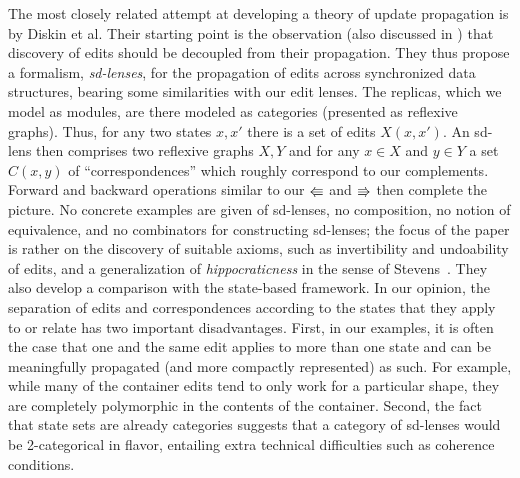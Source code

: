 
\iffull\spaceisnoissuetrue\fi  %

\newif \iftikz  \tikztrue
The most closely related attempt at developing a theory of update
propagation is \cite{Diskin-Delta11} by Diskin et al. Their starting
point is the observation (also discussed in \cite{Matching10}) that discovery of
edits should be decoupled from their propagation. They thus propose a
formalism, \emph{sd-lenses}, for the propagation of edits across
synchronized data structures, bearing some similarities with our
edit lenses. The replicas, which we model as modules, are there modeled
as categories (presented as reflexive graphs).
Thus, for any two states $x,x'$ there is a set of
edits $X(x,x')$. An sd-lens then comprises two reflexive graphs $X,Y$
and for any $x\in X$ and $y\in Y$ a set $C(x,y)$ of
``correspondences'' which roughly correspond to our
complements. Forward and backward operations similar to our $\mathord{\Lleftarrow}$ and
$\mathord{\Rrightarrow}$ then complete the picture. No concrete
examples are given of sd-lenses, no composition, no notion of equivalence, and
no combinators for constructing sd-lenses; the focus of the paper is
rather on the discovery of suitable axioms, such as invertibility and
undoability of edits, and a
generalization of {\em hippocraticness} in the sense of
Stevens~\cite{Stevens07}. They also develop a comparison
with the state-based framework. In
our opinion, the separation of edits and correspondences according to
the states that they apply to or relate has two important
disadvantages.  First, in our examples, it is often the case that one
and the same edit applies to more than one state and can be
meaningfully propagated (and more compactly represented) as such. For example, while many of the
container edits tend to only work for a particular shape, they are
completely polymorphic in the contents of the container. Second, the
fact that state sets are already categories suggests
that a category of sd-lenses would be
2-categorical in flavor, entailing extra technical difficulties such as
coherence conditions.

